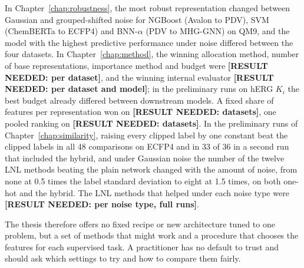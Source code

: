 In Chapter~\ref{chap:robustness}, the most robust representation changed between Gaussian and grouped-shifted noise for NGBoost (Avalon to PDV), SVM (ChemBERTa to ECFP4) and BNN-$\alpha$ (PDV to MHG-GNN) on QM9, and the model with the highest predictive performance under noise differed between the four datasets. In Chapter~\ref{chap:method}, the winning allocation method, number of base representations, importance method and budget were \textbf{[RESULT NEEDED: per dataset]}, and the winning internal evaluator \textbf{[RESULT NEEDED: per dataset and model]}; in the preliminary runs on hERG $K_i$ the best budget already differed between downstream models. A fixed share of features per representation won on \textbf{[RESULT NEEDED: datasets]}, one pooled ranking on \textbf{[RESULT NEEDED: datasets]}. In the preliminary runs of Chapter~\ref{chap:similarity}, raising every clipped label by one constant beat the clipped labels in all 48 comparisons on ECFP4 and in 33 of 36 in a second run that included the hybrid, and under Gaussian noise the number of the twelve LNL methods beating the plain network changed with the amount of noise, from none at 0.5 times the label standard deviation to eight at 1.5 times, on both one-hot and the hybrid. The LNL methods that helped under each noise type were \textbf{[RESULT NEEDED: per noise type, full runs]}.

The thesis therefore offers no fixed recipe or new architecture tuned to one problem, but a set of methods that might work and a procedure that chooses the features for each supervised task. A practitioner has no default to trust and should ask which settings to try and how to compare them fairly.




